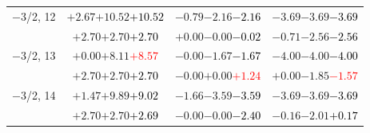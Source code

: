 \documentclass[compress]{beamer}
\begin{document}
\begin{frame}
\begin{tabular}{r | c | c | c}
$-$3/2, 12 & $+2.67$\hspace{0.1 cm}$+10.52$\hspace{0.1 cm}\textcolor{black}{$+10.52$} & $-0.79$\hspace{0.1 cm}$-2.16$\hspace{0.1 cm}\textcolor{black}{$-2.16$} & $-3.69$\hspace{0.1 cm}$-3.69$\hspace{0.1 cm}\textcolor{black}{$-3.69$} \\
           & $+2.70$\hspace{0.1 cm}$+2.70$\hspace{0.1 cm}\textcolor{black}{$+2.70$} & $+0.00$\hspace{0.1 cm}$-0.00$\hspace{0.1 cm}\textcolor{black}{$-0.02$} & $-0.71$\hspace{0.1 cm}$-2.56$\hspace{0.1 cm}\textcolor{black}{$-2.56$} \\
$-$3/2, 13 & $+0.00$\hspace{0.1 cm}$+8.11$\hspace{0.1 cm}\textcolor{red}{$+8.57$} & $-0.00$\hspace{0.1 cm}$-1.67$\hspace{0.1 cm}\textcolor{black}{$-1.67$} & $-4.00$\hspace{0.1 cm}$-4.00$\hspace{0.1 cm}\textcolor{black}{$-4.00$} \\
           & $+2.70$\hspace{0.1 cm}$+2.70$\hspace{0.1 cm}\textcolor{black}{$+2.70$} & $-0.00$\hspace{0.1 cm}$+0.00$\hspace{0.1 cm}\textcolor{red}{$+1.24$} & $+0.00$\hspace{0.1 cm}$-1.85$\hspace{0.1 cm}\textcolor{red}{$-1.57$} \\
$-$3/2, 14 & $+1.47$\hspace{0.1 cm}$+9.89$\hspace{0.1 cm}\textcolor{black}{$+9.02$} & $-1.66$\hspace{0.1 cm}$-3.59$\hspace{0.1 cm}\textcolor{black}{$-3.59$} & $-3.69$\hspace{0.1 cm}$-3.69$\hspace{0.1 cm}\textcolor{black}{$-3.69$} \\
           & $+2.70$\hspace{0.1 cm}$+2.70$\hspace{0.1 cm}\textcolor{black}{$+2.69$} & $-0.00$\hspace{0.1 cm}$-0.00$\hspace{0.1 cm}\textcolor{black}{$-2.40$} & $-0.16$\hspace{0.1 cm}$-2.01$\hspace{0.1 cm}\textcolor{black}{$+0.17$} \\

\end{tabular}
\end{frame}
\end{document}
